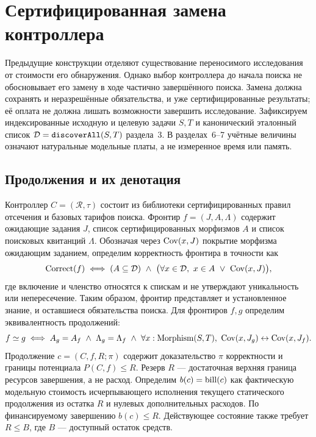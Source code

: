 \section{Сертифицированная замена контроллера}\label{sec:replacement}
Предыдущие конструкции отделяют существование переносимого исследования от стоимости его обнаружения. Однако выбор контроллера до начала поиска не обосновывает его замену в ходе частично завершённого поиска. Замена должна сохранять и неразрешённые обязательства, и уже сертифицированные результаты; её оплата не должна лишать возможности завершить исследование. Зафиксируем индексированные исходную и целевую задачи $S,T$ и канонический эталонный список $\mathcal D=\allowbreak\texttt{discoverAll}\allowbreak(S,T)$ раздела~3. В разделах~6--7 учётные величины означают натуральные модельные платы, а не измеренное время или память.

\subsection{Продолжения и их денотация}
Контроллер $C=(\mathcal R,\tau)$ состоит из библиотеки сертифицированных правил отсечения и базовых тарифов поиска. Фронтир $f=(J,A,\Lambda)$ содержит ожидающие задания $J$, список сертифицированных морфизмов $A$ и список поисковых квитанций $\Lambda$. Обозначая через $\operatorname{Cov}(x,J)$ покрытие морфизма ожидающим заданием, определим корректность фронтира в точности как
\begin{equation}\label{eq:frontier-correct}
 \operatorname{Correct}(f)\;\Longleftrightarrow\;
 (A\subseteq\mathcal D)\ \land\
 \bigl(\forall x\in\mathcal D,\ x\in A\ \lor\ \operatorname{Cov}(x,J)\bigr),
\end{equation}
где включение и членство относятся к спискам и не утверждают уникальность или непересечение. Таким образом, фронтир представляет и установленное знание, и оставшиеся обязательства поиска. Для фронтиров $f,g$ определим эквивалентность продолжений:
\begin{equation}\label{eq:same-cont}
 f\simeq g\;\Longleftrightarrow\;
 A_g=A_f\ \land\ \Lambda_g=\Lambda_f\ \land\
 \forall x:\mathrm{Morphism}(S,T),\ \Cov(x,J_g)\leftrightarrow\Cov(x,J_f).
\end{equation}
Продолжение $c=(C,f,R;\pi)$ содержит доказательство $\pi$ корректности и границы потенциала $P(C,f)\le R$. Резерв $R$ --- достаточная верхняя граница ресурсов завершения, а не расход. Определим $b(c)=\operatorname{bill}(c)$ как фактическую модельную стоимость исчерпывающего исполнения текущего статического продолжения из остатка $R$ и нулевых дополнительных расходов. По финансируемому завершению $b(c)\le R$. Действующее состояние также требует $R\le B$, где $B$ --- доступный остаток средств.

